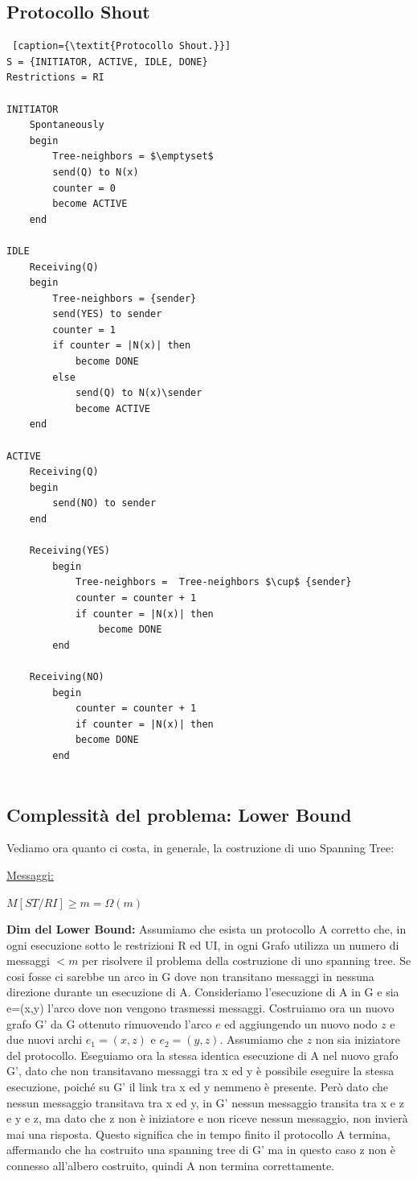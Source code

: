 \subsection{Protocollo Shout}
\begin{lstlisting} [caption={\textit{Protocollo Shout.}}]
S = {INITIATOR, ACTIVE, IDLE, DONE}
Restrictions = RI

INITIATOR 
    Spontaneously
    begin
        Tree-neighbors = $\emptyset$
        send(Q) to N(x)
        counter = 0
        become ACTIVE
    end

IDLE
    Receiving(Q)
    begin
        Tree-neighbors = {sender}
        send(YES) to sender
        counter = 1
        if counter = |N(x)| then
            become DONE
        else
            send(Q) to N(x)\sender
            become ACTIVE
    end

ACTIVE
    Receiving(Q)
    begin
        send(NO) to sender
    end
    
    Receiving(YES)
        begin
            Tree-neighbors =  Tree-neighbors $\cup$ {sender}
            counter = counter + 1
            if counter = |N(x)| then 
                become DONE        
        end
    
    Receiving(NO)
        begin
            counter = counter + 1
            if counter = |N(x)| then
            become DONE
        end
    
\end{lstlisting}

\subsection{Complessità del problema: Lower Bound}
Vediamo ora quanto ci costa, in generale, la costruzione di uno Spanning Tree:

\underline{Messaggi:}
\begin{center}
    $M[ST/RI] \geq m = \Omega(m)$
\end{center}
\textbf{Dim del Lower Bound:}
Assumiamo che esista un protocollo A corretto che, in ogni esecuzione sotto le
restrizioni R ed UI, in ogni Grafo utilizza un numero di messaggi $<m$ per
risolvere il problema della costruzione di uno spanning tree. Se cosi fosse ci
sarebbe un arco in G dove non transitano messaggi in nessuna direzione durante
un esecuzione di A. Consideriamo l'esecuzione di A in G e sia e=(x,y) l'arco
dove non vengono trasmessi messaggi. Costruiamo ora un nuovo grafo G' da G
ottenuto rimuovendo l'arco $e$ ed aggiungendo un nuovo nodo $z$ e due nuovi
archi $e_1=(x,z)$ e $e_2=(y,z)$. Assumiamo che $z$ non sia iniziatore del
protocollo. Eseguiamo ora la stessa identica esecuzione di A nel nuovo grafo G',
dato che non transitavano messaggi tra x ed y è possibile eseguire la stessa
esecuzione, poiché su G' il link tra x ed y nemmeno è presente. Però dato che
nessun messaggio transitava tra x ed y, in G' nessun messaggio transita tra x e
z e y e z, ma dato che z non è iniziatore e non riceve nessun messaggio, non
invierà mai una risposta. Questo significa che in tempo finito il protocollo A
termina, affermando che ha costruito una spanning tree di G' ma in questo caso z
non è connesso all'albero costruito, quindi A non termina correttamente.

